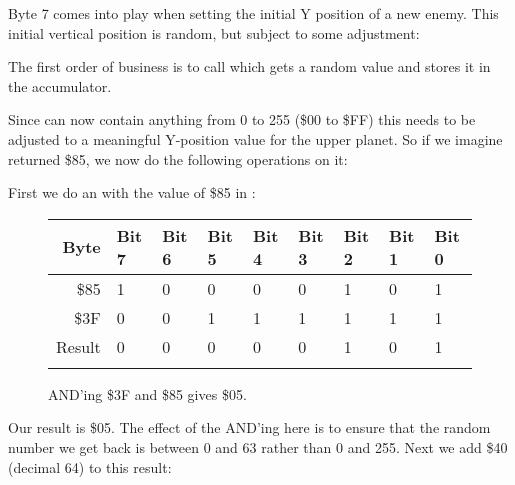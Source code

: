 Byte 7 comes into play when setting the initial Y position of a new enemy. This initial vertical
position is random, but subject to some adjustment:

%


The first order of business is to call  which gets a random value and stores it in the accumulator.

%


Since  can now contain anything from 0 to 255 (\$00 to \$FF) this needs to be adjusted to a meaningful Y-position
value for the upper planet. So if we imagine  returned \$85, we now do the
following operations on it:

%


First we do an  with the value of \$85 in :
\begin{figure}[H]
  {
    \setlength{\tabcolsep}{3.0pt}
    \setlength\cmidrulewidth{\heavyrulewidth} %
    \begin{adjustbox}{width=10cm,center}

      \begin{tabular}{rllllllll}
        \toprule
        Byte & Bit 7 & Bit 6 & Bit 5 & Bit 4 & Bit 3 & Bit 2 & Bit 1 & Bit 0        \\
        \midrule
        \$85 & 1 & 0 & 0 & 0 & 0 & 1 & 0 & 1 \\
        \$3F & 0 & 0 & 1 & 1 & 1 & 1 & 1 & 1 \\
        \midrule
        Result & 0 & 0 & 0 & 0 & 0 & 1 & 0 & 1 \\
        \addlinespace
        \bottomrule
      \end{tabular}

    \end{adjustbox}

    }\caption*{AND'ing \$3F and \$85 gives \$05.}
\end{figure}

Our result is \$05. The effect of the AND'ing here is to ensure that the random number we get back is between 0 and 63 rather
than 0 and 255. Next we add \$40 (decimal 64) to this result:

